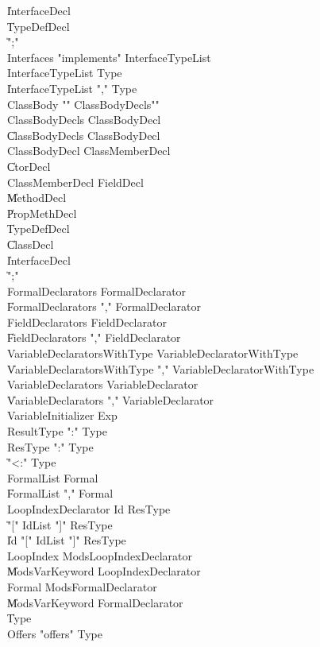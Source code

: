 {\begin{grammar}
    \| InterfaceDecl\\
    \| TypeDefDecl\\
    \| \xcd";"\\
 Interfaces  \: \xcd"implements" InterfaceTypeList\\
 InterfaceTypeList  \: Type\\
    \| InterfaceTypeList \xcd"," Type\\
 ClassBody  \: \xcd"{" ClassBodyDecls\opt \xcd"}"\\
 ClassBodyDecls  \: ClassBodyDecl\\
    \| ClassBodyDecls ClassBodyDecl\\
 ClassBodyDecl  \: ClassMemberDecl\\
    \| CtorDecl\\
 ClassMemberDecl  \: FieldDecl\\
    \| MethodDecl\\
    \| PropMethDecl\\
    \| TypeDefDecl\\
    \| ClassDecl\\
    \| InterfaceDecl\\
    \| \xcd";"\\
 FormalDeclarators  \: FormalDeclarator\\
    \| FormalDeclarators \xcd"," FormalDeclarator\\
 FieldDeclarators  \: FieldDeclarator\\
    \| FieldDeclarators \xcd"," FieldDeclarator\\
 VariableDeclaratorsWithType  \: VariableDeclaratorWithType\\
    \| VariableDeclaratorsWithType \xcd"," VariableDeclaratorWithType\\
 VariableDeclarators  \: VariableDeclarator\\
    \| VariableDeclarators \xcd"," VariableDeclarator\\
 VariableInitializer  \: Exp\\
 ResultType  \: \xcd":" Type\\
 ResType  \: \xcd":" Type\\
    \| \xcd"<:" Type\\
 FormalList  \: Formal\\
    \| FormalList \xcd"," Formal\\
 LoopIndexDeclarator  \: Id ResType\opt\\
    \| \xcd"[" IdList \xcd"]" ResType\opt\\
    \| Id \xcd"[" IdList \xcd"]" ResType\opt\\
 LoopIndex  \: Mods\opt LoopIndexDeclarator\\
    \| Mods\opt VarKeyword LoopIndexDeclarator\\
 Formal  \: Mods\opt FormalDeclarator\\
    \| Mods\opt VarKeyword FormalDeclarator\\
    \| Type\\
 Offers  \: \xcd"offers" Type\\
\end{grammar}

}
